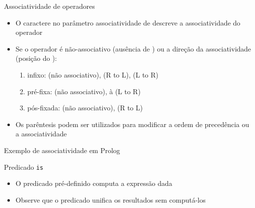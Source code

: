 \begin{frame}[fragile]{Associatividade de operadores}

    \begin{itemize}
        \item O caractere  no parâmetro associatividade de 
        descreve a associatividade do operador 

        \item Se o operador é não-associativo (ausência de ) ou a direção da 
            associatividade (posição do ):

        \begin{enumerate}
            \item infixo:  (não associativo),  (R to L),                 (L to R)
            \item pré-fixa:  (não associativo),  à (L to 
                R)
            \item pós-fixada:  (não associativo),  (R to 
                L)
        \end{enumerate}

        \item Os parêntesis podem ser utilizados para modificar a ordem de precedência ou a associatividade
    \end{itemize}

\end{frame}

\begin{frame}[fragile]{Exemplo de associatividade em Prolog}
\end{frame}

\begin{frame}[fragile]{Predicado {\tt is}}

    \begin{itemize}
        \item O predicado pré-definido  computa a expressão dada


    \item Observe que o predicado  unifica os resultados sem computá-los

    \end{itemize}

\end{frame}

